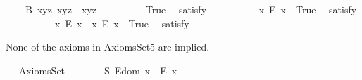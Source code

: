 \begin{isabellebody}
\ \ \ \ B{}{\isacharcolon}\ {\isachardoublequoteopen}\isactrlbold {\isasymforall}x{\isachardot}\isactrlbold {\isasymforall}y{\isachardot}\isactrlbold {\isasymforall}z{\isachardot}\ x{\isasymcdot}{\isacharparenleft}y{\isasymcdot}z{\isacharparenright}\ {\isasymcong}\ {\isacharparenleft}x{\isasymcdot}y{\isacharparenright}{\isasymcdot}z{\isachardoublequoteclose}\ \ \isanewline
\ \ \isanewline
\ \ \ \isamarkupfalse%
\ True\ \isamarkupfalse%
\ {\isacharbrackleft}satisfy{\isacharbrackright}%
\isadelimproof
\ %
\endisadelimproof
%
\isatagproof
{}\isamarkupfalse%
\ \ %
%
\endisatagproof
{\isafoldproof}%
%
\isadelimproof
%
\endisadelimproof
\isanewline
\ \ \ \isamarkupfalse%
\ \ {\isachardoublequoteopen}{\isasymexists}x{\isachardot}\ \isactrlbold {\isasymnot}{\isacharparenleft}E\ x{\isacharparenright}{\isachardoublequoteclose}\ \ True\ \isamarkupfalse%
\ {\isacharbrackleft}satisfy{\isacharbrackright}%
\isadelimproof
\ %
\endisadelimproof
%
\isatagproof
{}\isamarkupfalse%
\ \ %
%
\endisatagproof
{\isafoldproof}%
%
\isadelimproof
%
\endisadelimproof
\isanewline
\ \ \ \isamarkupfalse%
\ \ {\isachardoublequoteopen}{\isacharparenleft}{\isasymexists}x{\isachardot}\ \isactrlbold {\isasymnot}{\isacharparenleft}E\ x{\isacharparenright}{\isacharparenright}\ {\isasymand}\ {\isacharparenleft}{\isasymexists}x{\isachardot}\ {\isacharparenleft}E\ x{\isacharparenright}{\isacharparenright}{\isachardoublequoteclose}\ \ True\ \isamarkupfalse%
\ {\isacharbrackleft}satisfy{\isacharbrackright}%
\isadelimproof
\ %
\endisadelimproof
%
\isatagproof
{}\isamarkupfalse%
\ \ %
%
\endisatagproof
{\isafoldproof}%
%
\isadelimproof
%
\endisadelimproof
\isanewline
\ \ \isamarkupfalse%
%
\begin{isamarkuptext}%
None of the axioms in AxiomsSet5 are implied.%
\end{isamarkuptext}\isamarkuptrue%
\ \isamarkupfalse%
\ AxiomsSet{}\isanewline
\ \ \isanewline
\ \ \ \isamarkupfalse%
\ S{}{\isacharcolon}\ {\isachardoublequoteopen}E{\isacharparenleft}dom\ x{\isacharparenright}\ \isactrlbold {\isasymrightarrow}\ E\ x{\isachardoublequoteclose}\ \isamarkupfalse%
%
\isadelimproof

\end{isabellebody}
